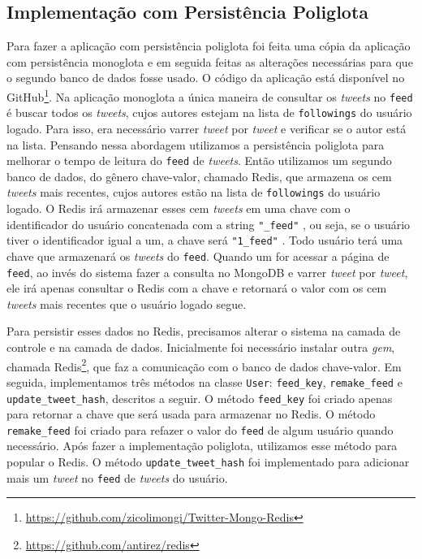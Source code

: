 \subsection{Implementação com Persistência Poliglota}
\label{subsec:polyglot}

Para fazer a aplicação com persistência poliglota foi feita uma cópia da aplicação com persistência monoglota e em seguida feitas as alterações necessárias para que o segundo banco de dados fosse usado. O código da aplicação está disponível no GitHub\footnote{\url{https://github.com/zicolimongi/Twitter-Mongo-Redis}}.
Na aplicação monoglota a única maneira de consultar os \textit{tweets} no \verb|feed| é buscar todos os \textit{tweets}, cujos autores estejam na lista de \verb|followings| do usuário logado. Para isso, era necessário varrer \textit{tweet} por \textit{tweet} e verificar se o autor está na lista. Pensando nessa abordagem utilizamos a persistência poliglota para melhorar o tempo de leitura do \verb|feed| de \textit{tweets}.
Então utilizamos um segundo banco de dados, do gênero chave-valor, chamado \ac{Redis}, que armazena os cem \textit{tweets} mais recentes, cujos autores estão na lista de \verb|followings| do usuário logado.
O \ac{Redis} irá armazenar esses cem \textit{tweets} em uma chave com o identificador do usuário concatenada com a string \verb|"_feed"| , ou seja, se o usuário tiver o identificador igual a um, a chave será \verb|"1_feed"| . Todo usuário terá uma chave que armazenará os \textit{tweets} do \verb|feed|. Quando um for acessar a página de \verb|feed|, ao invés do sistema fazer a consulta no MongoDB e varrer \textit{tweet} por \textit{tweet}, ele irá apenas consultar o \ac{Redis} com a chave e retornará o valor com os cem \textit{tweets} mais recentes que o usuário logado segue.


Para persistir esses dados no \ac{Redis}, precisamos alterar o sistema na camada de controle e na camada de dados. Inicialmente foi necessário instalar outra \textit{gem}, chamada \ac{Redis}\footnote{\url{https://github.com/antirez/redis}}, que faz a comunicação com o banco de dados chave-valor. Em seguida, implementamos três métodos na classe \verb|User|: \verb|feed_key|, \verb|remake_feed| e \verb|update_tweet_hash|, descritos a seguir. O método \verb|feed_key| foi criado apenas para retornar a chave que será usada para armazenar no \ac{Redis}. O método \verb|remake_feed| foi criado para refazer o valor do \verb|feed| de algum usuário quando necessário. Após fazer a implementação poliglota, utilizamos esse método para popular o \ac{Redis}. O método \verb|update_tweet_hash| foi implementado para adicionar mais um \textit{tweet} no \verb|feed| de \textit{tweets} do usuário.

